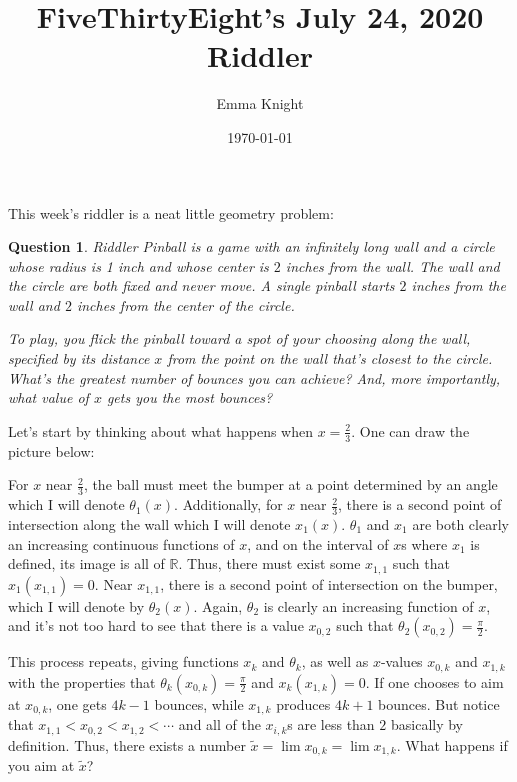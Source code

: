 \documentclass[11pt]{article}
\title{FiveThirtyEight's July 24, 2020 Riddler}
\author{Emma Knight}
\date{\today}
\newtheorem{question}[theorem]{Question}
\theoremstyle{definition}
\newcommand{\R}{\mathbb{R}}
\begin{document}
\maketitle
This week's riddler is a neat little geometry problem:
\begin{question}
Riddler Pinball is a game with an infinitely long wall and a circle whose radius is 1 inch and whose center is $2$ inches from the wall. The wall and the circle are both fixed and never move. A single pinball starts $2$ inches from the wall and $2$ inches from the center of the circle.

To play, you flick the pinball toward a spot of your choosing along the wall, specified by its distance $x$ from the point on the wall that’s closest to the circle.  What’s the greatest number of bounces you can achieve? And, more importantly, what value of $x$ gets you the most bounces?
\end{question}
Let's start by thinking about what happens when $x = \frac{2}{3}$.  One can draw the picture below:


For $x$ near $\frac{2}{3}$, the ball must meet the bumper at a point determined by an angle which I will denote $\theta_1(x)$.  Additionally, for $x$ near $\frac{2}{3}$, there is a second point of intersection along the wall which I will denote $x_1(x)$.  $\theta_1$ and $x_1$ are both clearly an increasing continuous functions of $x$, and on the interval of $x$s where $x_1$ is defined, its image is all of $\R$.  Thus, there must exist some $x_{1,1}$ such that $x_1(x_{1,1}) = 0$.  Near $x_{1,1}$, there is a second point of intersection on the bumper, which I will denote by $\theta_2(x)$.  Again, $\theta_2$ is clearly an increasing function of $x$, and it's not too hard to see that there is a value $x_{0,2}$ such that $\theta_2(x_{0,2}) = \frac{\pi}{2}$.

This process repeats, giving functions $x_k$ and $\theta_k$, as well as $x$-values $x_{0, k}$ and $x_{1, k}$ with the properties that $\theta_k(x_{0,k}) = \frac{\pi}{2}$ and $x_k(x_{1,k}) = 0$.  If one chooses to aim at $x_{0,k}$, one gets $4k-1$ bounces, while $x_{1, k}$ produces $4k+1$ bounces.  But notice that $x_{1,1} < x_{0,2} < x_{1,2} < \cdots$ and all of the $x_{i,k}$s are less than $2$ basically by definition.  Thus, there exists a number $\tilde{x} = \lim x_{0, k} = \lim x_{1,k}$.  What happens if you aim at $\tilde{x}$?
\end{document}
